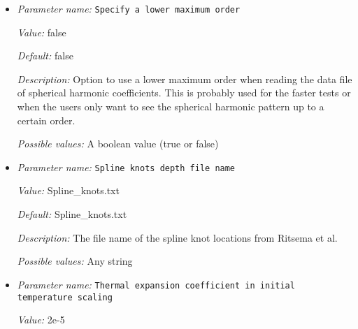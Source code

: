 \begin{itemize}
{\it Possible values:} A floating point number $v$ such that $-\text{MAX\_DOUBLE} \leq v \leq \text{MAX\_DOUBLE}$
\item {\it Parameter name:} {\tt Specify a lower maximum order}
\label{parameters:Initial temperature model/S40RTS perturbation/Specify a lower maximum order}
\label{parameters:Initial_20temperature_20model/S40RTS_20perturbation/Specify_20a_20lower_20maximum_20order}


{\it Value:} false


{\it Default:} false


{\it Description:} Option to use a lower maximum order when reading the data file of spherical harmonic coefficients. This is probably used for the faster tests or when the users only want to see the spherical harmonic pattern up to a certain order.


{\it Possible values:} A boolean value (true or false)
\item {\it Parameter name:} {\tt Spline knots depth file name}
\label{parameters:Initial temperature model/S40RTS perturbation/Spline knots depth file name}
\label{parameters:Initial_20temperature_20model/S40RTS_20perturbation/Spline_20knots_20depth_20file_20name}


{\it Value:} Spline\_knots.txt


{\it Default:} Spline\_knots.txt


{\it Description:} The file name of the spline knot locations from Ritsema et al.


{\it Possible values:} Any string
\item {\it Parameter name:} {\tt Thermal expansion coefficient in initial temperature scaling}
\label{parameters:Initial temperature model/S40RTS perturbation/Thermal expansion coefficient in initial temperature scaling}
\label{parameters:Initial_20temperature_20model/S40RTS_20perturbation/Thermal_20expansion_20coefficient_20in_20initial_20temperature_20scaling}


{\it Value:} 2e-5



\end{itemize}
